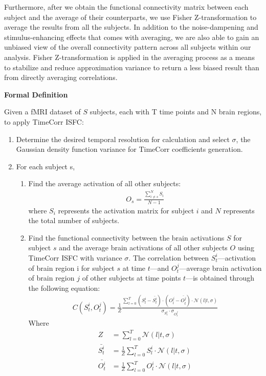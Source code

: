 \documentclass[11pt]{article}
\begin{document}
Furthermore, after we obtain the functional connectivity matrix between each subject and the average of their counterparts, we use Fisher Z-transformation to average the results from all the subjects. In addition to the noise-dampening and stimulus-enhancing effects that comes with averaging, we are also able to gain an unbiased view of the overall connectivity pattern across all subjects within our analysis. Fisher Z-transformation is applied in the averaging process as a means to stabilize and reduce approximation variance to return a less biased result than from directly averaging correlations.

\large{\textbf{Formal Definition}}

\normalsize
Given a fMRI dataset of $S$ subjects, each with T time points and N brain regions, to apply TimeCorr ISFC:
\begin{enumerate}
\item Determine the desired temporal resolution for calculation and select $\sigma$, the Gaussian density function variance for TimeCorr coefficients generation.
\item For each subject s,
\begin{enumerate}
\item Find the average activation of all other subjects:
\begin{align*}
O_s=\frac{\sum_{i\neq s}^N S_i}{N-1}
\end{align*}
where $S_i$ represents the activation matrix for subject $i$ and $N$ represents the total number of subjects.
\item Find the functional connectivity between the brain activations $S$ for subject $s$ and the average brain activations of all other subjects $O$ using TimeCorr ISFC with variance $\sigma$. The correlation between $S^i_t$---activation of brain region i for subject $s$ at time $t$---and $O^j_t$---average brain activation of brain region $j$ of other subjects at time points $t$---is obtained through the following equation:
\begin{align*}
C(S^i_t,O^j_t) = \frac{1}{Z}\frac{\sum_{l=0}^T (S_l^i - \bar{S^i_t})\cdot(O^j_l - \bar{O^j_t})\cdot \mathcal{N}(l|t,\sigma)}{\sigma_{S_t^i} \cdot \sigma_{O_t^j}}
\end{align*}
Where
\begin{align*}
Z &= \sum_{l=0}^T \mathcal{N}(l|t,\sigma)\\
\bar{S^i_t} &=\frac{1}{Z} \sum_{l=0}^T S^i_l \cdot \mathcal{N}(l|t,\sigma)\\
\bar{O^i_t} &=\frac{1}{Z} \sum_{l=0}^T O^i_l \cdot \mathcal{N}(l|t,\sigma)\\

\end{align*}
\end{enumerate}
\end{enumerate}
\end{document}
